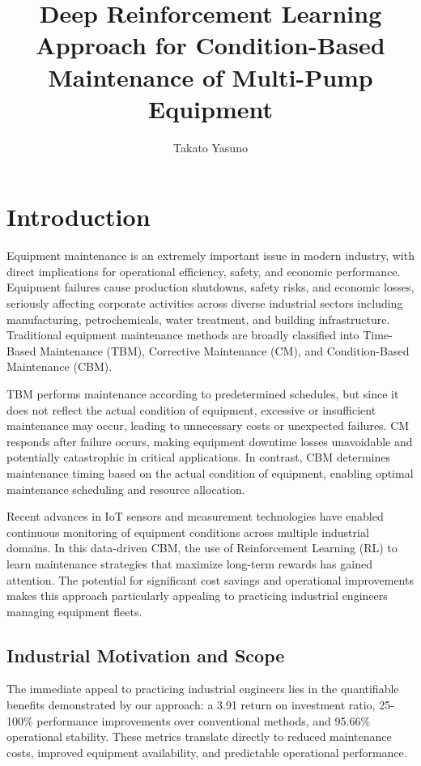 \documentclass[twocolumn]{article}
\title{Deep Reinforcement Learning Approach for Condition-Based\\Maintenance of Multi-Pump Equipment}
\author{%
Takato Yasuno\first
}
\begin{document}
\maketitle

\section{Introduction}

Equipment maintenance is an extremely important issue in modern industry, with direct implications for operational efficiency, safety, and economic performance. Equipment failures cause production shutdowns, safety risks, and economic losses, seriously affecting corporate activities across diverse industrial sectors including manufacturing, petrochemicals, water treatment, and building infrastructure. Traditional equipment maintenance methods are broadly classified into Time-Based Maintenance (TBM), Corrective Maintenance (CM), and Condition-Based Maintenance (CBM)\cite{Ahmad2012}.

TBM performs maintenance according to predetermined schedules, but since it does not reflect the actual condition of equipment, excessive or insufficient maintenance may occur, leading to unnecessary costs or unexpected failures. CM responds after failure occurs, making equipment downtime losses unavoidable and potentially catastrophic in critical applications. In contrast, CBM determines maintenance timing based on the actual condition of equipment, enabling optimal maintenance scheduling and resource allocation.

Recent advances in IoT sensors and measurement technologies have enabled continuous monitoring of equipment conditions across multiple industrial domains. In this data-driven CBM, the use of Reinforcement Learning (RL) to learn maintenance strategies that maximize long-term rewards has gained attention\cite{Li2019}. The potential for significant cost savings and operational improvements makes this approach particularly appealing to practicing industrial engineers managing equipment fleets.

\subsection{Industrial Motivation and Scope}

The immediate appeal to practicing industrial engineers lies in the quantifiable benefits demonstrated by our approach: a 3.91 return on investment ratio, 25-100\% performance improvements over conventional methods, and 95.66\% operational stability. These metrics translate directly to reduced maintenance costs, improved equipment availability, and predictable operational performance.
\end{document}
